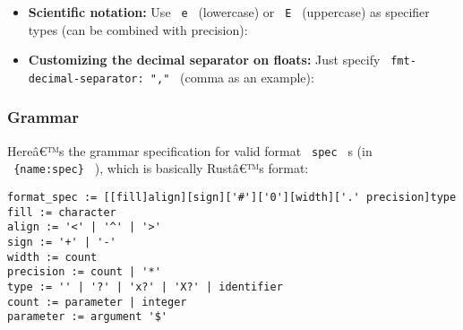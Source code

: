 \begin{itemize}
\tightlist
\item
  \textbf{Scientific notation:} Use \texttt{\ e\ } (lowercase) or
  \texttt{\ E\ } (uppercase) as specifier types (can be combined with
  precision):
\end{itemize}

\begin{Shaded}
\begin{Highlighting}[]

\end{Highlighting}
\end{Shaded}

\begin{itemize}
\tightlist
\item
  \textbf{Customizing the decimal separator on floats:} Just specify
  \texttt{\ fmt-decimal-separator:\ ","\ } (comma as an example):
\end{itemize}

\begin{Shaded}
\begin{Highlighting}[]

\end{Highlighting}
\end{Shaded}

\subsubsection{Grammar}\label{grammar}

Hereâ€™s the grammar specification for valid format \texttt{\ spec\ } s
(in \texttt{\ \{name:spec\}\ } ), which is basically Rustâ€™s format:

\begin{verbatim}
format_spec := [[fill]align][sign]['#']['0'][width]['.' precision]type
fill := character
align := '<' | '^' | '>'
sign := '+' | '-'
width := count
precision := count | '*'
type := '' | '?' | 'x?' | 'X?' | identifier
count := parameter | integer
parameter := argument '$'
\end{verbatim}

